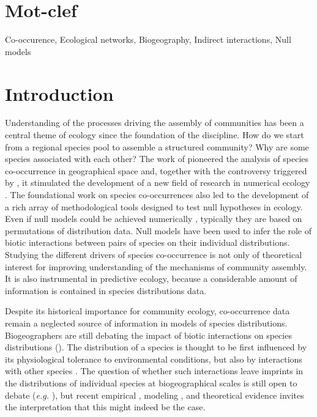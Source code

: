 \section{Mot-clef}

Co-occurence, Ecological networks, Biogeography, Indirect interactions, Null models


\section{Introduction}
\label{intro}

Understanding of the processes driving the assembly of communities has been a central theme of ecology since the foundation of the discipline. How do we start from a regional species pool to assemble a structured community? Why are some species associated with each other? The work of \cite{Diamond1975} pioneered the analysis of species co-occurrence in geographical space and, together with the controversy triggered by
\cite{Connor1979}, it stimulated the development of a new field of
research in numerical ecology \citep{Stone1990, Gotelli1996,
legendre2012numerical}.
The foundational work on species co-occurrences also led to the development of a rich array of methodological tools designed to test null hypotheses in ecology. Even if null models could be achieved numerically \citep[\textit{e.g.},][]{Araujo2011}, typically they are based on permutations of distribution data.
Null models have been used to infer the role of biotic interactions between pairs of species on their individual distributions. Studying the different drivers of species co-occurrence is not only of theoretical interest for improving understanding of the mechanisms of community assembly. It is also instrumental in predictive ecology, because a considerable amount of information is contained in species distributions data.

Despite its historical importance for community ecology, co-occurrence data remain a neglected source of information in models of species distributions.
Biogeographers are still debating the impact of biotic interactions on species distributions (\citealt{Guisan2005, Gotelli2010,
Kissling2012, Pellissier2013}).
The distribution of a species
is thought to be first influenced by its physiological tolerance to
environmental conditions, but also by interactions with other species
\citep{Hutchinson1957, macarthur1972geographical,
Peterson2011, Boulangeat2012}.
The question of whether such
interactions leave imprints in the distributions of individual species at
biogeographical scales is still open to debate (\textit{e.g.}
\citealt{Davis1998}), but recent empirical
\citealt{Gotelli2010}, modeling
\citep[\textit{e.g.},][]{Araujo2007}, and theoretical \citep{Araujo2011}
evidence invites the interpretation that this might indeed be the case.

